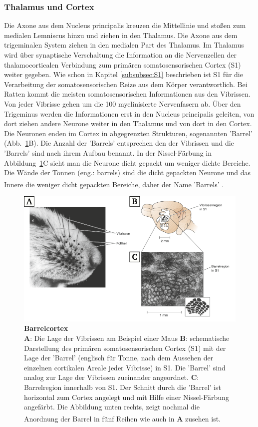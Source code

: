 \documentclass[12pt,a4paper,pdftex]{article}
\begin{document}
\subsubsection*{Thalamus und Cortex}
Die Axone aus dem Nucleus principalis kreuzen die Mittellinie und stoßen zum medialen Lemniscus hinzu und ziehen in den Thalamus. Die Axone aus dem trigeminalen System ziehen in den medialen Part des Thalamus. Im Thalamus wird über synaptische Verschaltung die Information an die Nervenzellen der thalamocorticalen Verbindung zum primären somatosensorischen Cortex (S1) weiter gegeben. 
Wie schon in Kapitel \ref{subsubsec:S1} beschrieben ist S1 für die Verarbeitung der somatosensorischen Reize aus dem Körper verantwortlich. Bei Ratten kommt die meisten somatosensorischen Informationen aus den Vibrissen. Von jeder Vibrisse gehen um die 100 myelinisierte Nervenfasern ab. Über den Trigeminus werden die Informationen erst in den Nucleus principalis geleiten, von dort ziehen andere Neurone weiter in den Thalamus und von dort in den Cortex. Die Neuronen enden im Cortex in abgegrenzten Strukturen, sogenannten 'Barrel' (Abb.~\ref{fig:barrelcortex}B). Die Anzahl der 'Barrels' entsprechen den der Vibrissen und die 'Barrels' sind nach ihrem Aufbau benannt. In der Nissel-Färbung in Abbildung~\ref{fig:barrelcortex}C sieht man die Neurone dicht gepackt um weniger dichte Bereiche. Die Wände der Tonnen (eng.: barrels) sind die dicht gepackten Neurone und das Innere die weniger dicht gepackten Bereiche, daher der Name 'Barrels' \textsuperscript{\cite[8]{smith2008biology}}. 

\begin{figure}[H]
    \centering
    \includegraphics[width = \textwidth] {pictures/somatosensory/barrelcortex.png}
    \caption[Barrelcortex]{\textbf{Barrelcortex}\\
    \textbf{A}: Die Lage der Vibrissen am Beispiel einer Maus \textbf{B}: schematische Darstellung des primären somatosensorischen Cortex (S1) mit der Lage der 'Barrel' (englisch für Tonne, nach dem Aussehen der einzelnen cortikalen Areale jeder Vibrisse) in S1. Die 'Barrel' sind analog zur Lage der Vibrissen zueinander angeordnet. \textbf{C}: Barrelregion innerhalb von S1. Der Schnitt durch die 'Barrel' ist horizontal zum Cortex angelegt und mit Hilfe einer Nissel-Färbung angefärbt. Die Abbildung unten rechts, zeigt nochmal die Anordnung der Barrel in fünf Reihen wie auch in \textbf{A} zusehen ist.
    \textsuperscript{\cite{barrelcortex2008}}}
    \label{fig:barrelcortex}
\end{figure}
\end{document}
